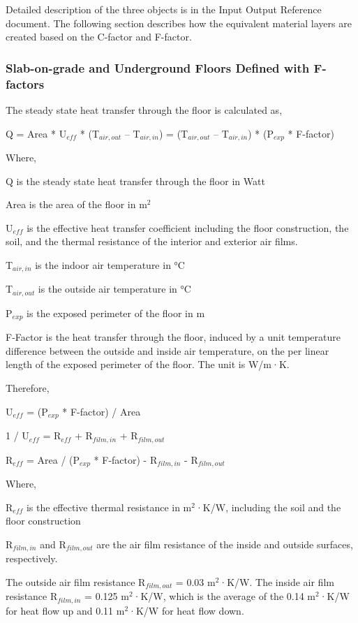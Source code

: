 Detailed description of the three objects is in the Input Output Reference document. The following section describes how the equivalent material layers are created based on the C-factor and F-factor.

\subsubsection{Slab-on-grade and Underground Floors Defined with F-factors}\label{slab-on-grade-and-underground-floors-defined-with-f-factors}

The steady state heat transfer through the floor is calculated as,

Q = Area * U\(_{eff}\) * (T\(_{air,out}\) -- T\(_{air,in}\)) = (T\(_{air,out}\) -- T\(_{air,in}\)) * (P\(_{exp}\) * F-factor)

Where,

Q is the steady state heat transfer through the floor in Watt

Area is the area of the floor in m\(^{2}\)

U\(_{eff}\) is the effective heat transfer coefficient including the floor construction, the soil, and the thermal resistance of the interior and exterior air films.

T\(_{air,in}\) is the indoor air temperature in °C

T\(_{air,out}\) is the outside air temperature in °C

P\(_{exp}\) is the exposed perimeter of the floor in m

F-Factor is the heat transfer through the floor, induced by a unit temperature difference between the outside and inside air temperature, on the per linear length of the exposed perimeter of the floor. The unit is W/m·K.

Therefore,

U\(_{eff}\) = (P\(_{exp}\) * F-factor) / Area

1 / U\(_{eff}\) = R\(_{eff}\) + R\(_{film,in}\) + R\(_{film,out}\)

R\(_{eff}\) = Area / (P\(_{exp}\) * F-factor) - R\(_{film,in}\) - R\(_{film,out}\)

Where,

R\(_{eff}\) is the effective thermal resistance in m\(^{2}\)·K/W, including the soil and the floor construction

R\(_{film,in}\) and R\(_{film,out}\) are the air film resistance of the inside and outside surfaces, respectively.

The outside air film resistance R\(_{film,out}\) = 0.03 m\(^{2}\)·K/W. The inside air film resistance R\(_{film,in}\) = 0.125 m\(^{2}\)·K/W, which is the average of the 0.14 m\(^{2}\)·K/W for heat flow up and 0.11 m\(^{2}\)·K/W for heat flow down.

